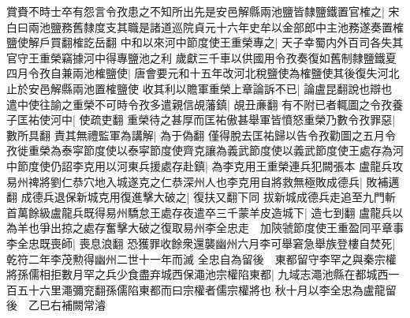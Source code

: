 賞賚不時士卒有怨言令孜患之不知所出先是安邑解縣兩池鹽皆隸鹽鐵置官榷之|{
	宋白曰兩池鹽務舊隸度支其職是諸道巡院貞元十六年史牟以金部郎中主池務遂奏置榷鹽使解戶買翻榷訖岳翻}
中和以來河中節度使王重榮專之|{
	天子幸蜀内外百司各失其官守王重榮竊據河中得專鹽池之利}
歲獻三千車以供國用令孜奏復如舊制隸鹽鐵夏四月令孜自兼兩池榷鹽使|{
	唐會要元和十五年改河北稅鹽使為榷鹽使其後復失河北止於安邑解縣兩池置榷鹽使}
收其利以贍軍重榮上章論訴不已|{
	論盧昆翻說也辯也}
遣中使往諭之重榮不可時令孜多遣親信覘藩鎮|{
	覘丑亷翻}
有不附已者輒圖之令孜養子匡祐使河中|{
	使疏吏翻}
重榮待之甚厚而匡祐傲甚舉軍皆憤怒重榮乃數令孜罪惡|{
	數所具翻}
責其無禮監軍為講解|{
	為于偽翻}
僅得脫去匡祐歸以告令孜勸圖之五月令孜徙重榮為泰寜節度使以泰寜節度使齊克讓為義武節度使以義武節度使王處存為河中節度使仍詔李克用以河東兵援處存赴鎮|{
	為李克用王重榮連兵犯闕張本}
盧龍兵攻易州禆將劉仁恭穴地入城遂克之仁恭深州人也李克用自將救無極敗成德兵|{
	敗補邁翻}
成德兵退保新城克用復進擊大破之|{
	復扶又翻下同}
拔新城成德兵走追至九門斬首萬餘級盧龍兵既得易州驕怠王處存夜遣卒三千蒙羊皮造城下|{
	造七到翻}
盧龍兵以為羊也爭出掠之處存奮擊大破之復取易州李全忠走　加陝虢節度使王重盈同平章事　李全忠既喪師|{
	喪息浪翻}
恐獲罪收餘衆還襲幽州六月李可舉窘急舉族登樓自焚死|{
	乾符二年李茂勲得幽州二世十一年而滅}
全忠自為留後　東都留守李罕之與秦宗權將孫儒相拒數月罕之兵少食盡弃城西保澠池宗權陷東都|{
	九域志澠池縣在都城西一百五十六里澠彌兖翻孫儒陷東都而曰宗權者儒宗權將也}
秋十月以李全忠為盧龍留後　乙巳右補闕常濬

